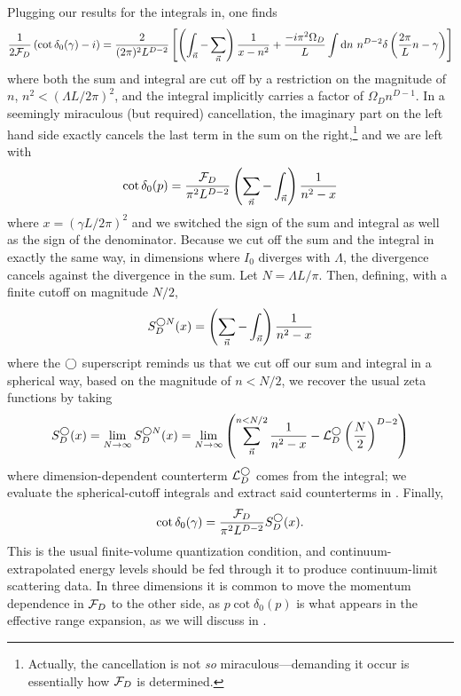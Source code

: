 Plugging our results for the integrals in, one finds
\begin{equation}
    \frac{1}{2\mathcal{F}_D}\left(\cot \delta_0(\gamma) - i\right) = \frac{2}{(2\pi)^2 L^{D-2}}\left[ \left(\int_{\vec{n}} - \sum_{\vec{n}}\right) \frac{1}{x-n^2} + \frac{-i \pi^2\Omega_D}{L} \int \mathrm{d}n\ n^{D-2} \delta\left(\frac{2\pi}{L}n - \gamma\right) \right]
\end{equation}
where both the sum and integral are cut off by a restriction on the magnitude of $n$, $n^2 < (\Lambda L / 2\pi)^2$, and the integral implicitly carries a factor of $\Omega_D n^{D-1}$.
In a seemingly miraculous (but required) cancellation, the imaginary part on the left hand side exactly cancels the last term in the sum on the right,\footnote{Actually, the cancellation is not \emph{so} miraculous---demanding it occur is essentially how $\mathcal{F}_D$ is determined.} and we are left with
\begin{equation}
    \cot \delta_0(p) = \frac{\mathcal{F}_D}{\pi^2 L^{D-2}} \left(\sum_{\vec{n}}-\int_{\vec{n}}\right) \frac{1}{n^2-x}
\end{equation}
where $x=(\gamma L/2\pi)^2$ and we switched the sign of the sum and integral as well as the sign of the denominator.
Because we cut off the sum and the integral in exactly the same way, in dimensions where $I_0$ diverges with $\Lambda$, the divergence cancels against the divergence in the sum.
Let $N=\Lambda L/\pi$.
Then, defining, with a finite cutoff on magnitude $N/2$,
\begin{equation}\label{eq:spherical cutoff S}
    S^{\bigcirc N}_D(x) = \left(\sum_{\vec{n}}- \int_{\vec{n}}\right) \frac{1}{n^2-x}
\end{equation}
where the $\bigcirc$ superscript reminds us that we cut off our sum and integral in a spherical way, based on the magnitude of $n<N/2$, we recover the usual \Luscher zeta functions by taking
\begin{equation}\label{eq:spherical S}
    S^\bigcirc_D(x)
    =
    \lim_{N\rightarrow\infty} S^{\bigcirc N}_D(x)
    =
    \lim_{N\rightarrow\infty}\left( \sum_{\vec{n}}^{n < N/2} \frac{1}{n^2-x} - \mathcal{L}_D^\bigcirc \left(\frac{N}{2}\right)^{D-2}\right)
\end{equation}
where dimension-dependent counterterm $\mathcal{L}_D^\bigcirc$ comes from the integral; we evaluate the spherical-cutoff integrals and extract said counterterms in .
Finally,
\begin{equation}\label{eq:spherical quantization}
    \cot \delta_0(\gamma) = \frac{\mathcal{F}_D}{\pi^2 L^{D-2}} S^\bigcirc_D(x).
\end{equation}
This is the usual \Luscher finite-volume quantization condition, and continuum-extrapolated energy levels should be fed through it to produce continuum-limit scattering data.
In three dimensions it is common to move the momentum dependence in $\mathcal{F}_D$ to the other side, as $p \cot\delta_0(p)$ is what appears in the effective range expansion, as we will discuss in .

